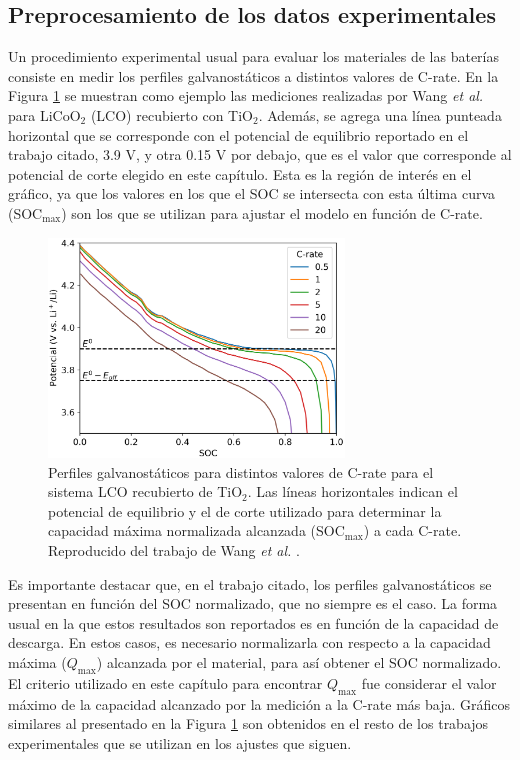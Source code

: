 \subsection{Preprocesamiento de los datos experimentales}

Un procedimiento experimental usual para evaluar los materiales de las baterías
consiste en medir los perfiles galvanostáticos a distintos valores de C-rate.
En la Figura \ref{fig:preproc} se muestran como ejemplo las mediciones realizadas
por Wang \textit{et al.} \cite{wang2019high} para LiCoO$_2$ (LCO) recubierto con 
TiO$_2$. Además, se agrega una línea punteada horizontal que se corresponde
con el potencial de equilibrio reportado en el trabajo citado, 3.9 V, y otra
0.15 V por debajo, que es el valor que corresponde al potencial de corte
elegido en este capítulo. Esta es la región de interés en el gráfico, ya que 
los valores en los que el SOC se intersecta con esta última curva (SOC$_{\max}$)
son los que se utilizan para ajustar el modelo en función de C-rate.
\begin{figure}[h!]
    \centering
    \includegraphics[width=0.7\textwidth]{FastCharging/un/resultados/preprocesamiento/preprocesamiento.png}
    \caption{Perfiles galvanostáticos para distintos valores de C-rate para el
    sistema LCO recubierto de TiO$_2$. Las líneas horizontales indican el 
    potencial de equilibrio y el de corte utilizado para determinar la 
    capacidad máxima normalizada alcanzada (SOC$_{\max}$) a cada C-rate. 
    Reproducido del trabajo de Wang \textit{et al.} \cite{wang2019high}.}
    \label{fig:preproc}
\end{figure}

Es importante destacar que, en el trabajo citado, los perfiles galvanostáticos
se presentan en función del SOC normalizado, que no siempre es el caso. La 
forma usual en la que estos resultados son reportados es en función de la 
capacidad de descarga. En estos casos, es necesario normalizarla con respecto
a la capacidad máxima ($Q_{\max}$) alcanzada por el material, para así obtener
el SOC normalizado. El criterio utilizado en este capítulo para encontrar 
$Q_{\max}$ fue considerar el valor máximo de la capacidad alcanzado por la 
medición a la C-rate más baja. Gráficos similares al presentado en la Figura 
\ref{fig:preproc} son obtenidos en el resto de los trabajos experimentales que
se utilizan en los ajustes que siguen.
